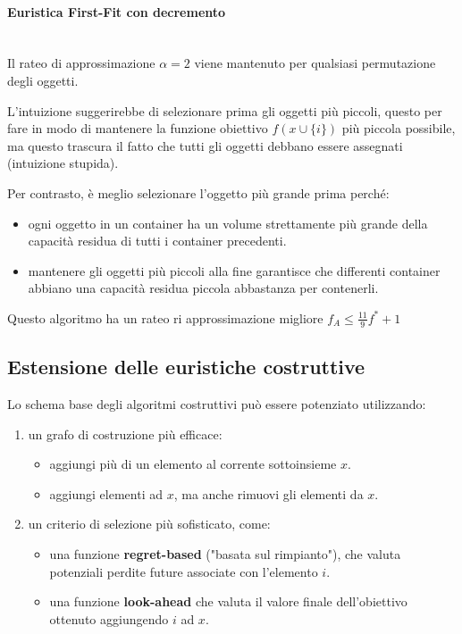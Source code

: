 \documentclass{article}
\begin{document}
    \paragraph{Euristica First-Fit con decremento}\mbox{}\\
    Il rateo di approssimazione $\alpha =2$ viene mantenuto per qualsiasi permutazione degli
    oggetti.

    L'intuizione suggerirebbe di selezionare prima gli oggetti più piccoli, questo per fare in
    modo di mantenere la funzione obiettivo $f(x\cup\{i\})$ più piccola possibile, ma questo
    trascura il fatto che tutti gli oggetti debbano essere assegnati (intuizione stupida).

    Per contrasto, è meglio selezionare l'oggetto più grande prima perché:
    \begin{itemize}
        \item ogni oggetto in un container ha un volume strettamente più grande
              della capacità residua di tutti i container precedenti.
        \item mantenere gli oggetti più piccoli alla fine garantisce che differenti
              container abbiano una capacità residua piccola abbastanza per contenerli.
    \end{itemize}
    Questo algoritmo ha un rateo ri approssimazione migliore $f_A\leq \frac{11}{9}f^*+1$

    \subsection{Estensione delle euristiche costruttive}
    Lo schema base degli algoritmi costruttivi può essere potenziato utilizzando:
    \begin{enumerate}
        \item un grafo di costruzione più efficace:
              \begin{itemize}
                  \item aggiungi più di un elemento al corrente sottoinsieme $x$.
                  \item aggiungi elementi ad $x$, ma anche rimuovi gli elementi da $x$.
              \end{itemize}

        \item un criterio di selezione più sofisticato, come:
              \begin{itemize}
                  \item una funzione \textbf{regret-based} ("basata sul rimpianto"), che
                        valuta potenziali perdite future associate con l'elemento $i$.
                  \item una funzione \textbf{look-ahead} che valuta il valore finale dell'obiettivo
                        ottenuto aggiungendo $i$ ad $x$.
              \end{itemize}
    \end{enumerate}
\end{document}
